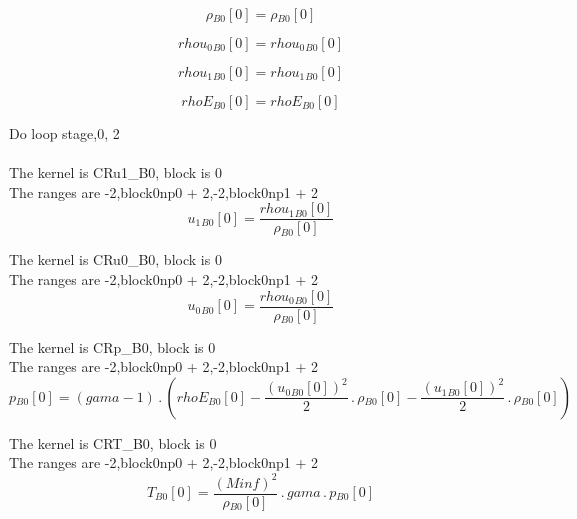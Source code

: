 \documentclass{article}
\begin{document}
\begin{dmath}{\rho{_{B0}}}[{0}] = {\rho{_{B0}}}[{0}]\end{dmath}

\begin{dmath}{rhou_{0}{_{B0}}}[{0}] = {rhou_{0}{_{B0}}}[{0}]\end{dmath}

\begin{dmath}{rhou_{1}{_{B0}}}[{0}] = {rhou_{1}{_{B0}}}[{0}]\end{dmath}

\begin{dmath}{rhoE{_{B0}}}[{0}] = {rhoE{_{B0}}}[{0}]\end{dmath}

\noindent Do loop stage,0, 2\\
\\\noindent The kernel is CRu1_B0, block is 0\\\noindent The ranges are -2,block0np0 + 2,-2,block0np1 + 2\\\begin{dmath}{u_{1}{_{B0}}}[{0}] = \frac{{rhou_{1}{_{B0}}}[{0}]}{{\rho{_{B0}}}[{0}]}\end{dmath}

\noindent The kernel is CRu0_B0, block is 0\\\noindent The ranges are -2,block0np0 + 2,-2,block0np1 + 2\\\begin{dmath}{u_{0}{_{B0}}}[{0}] = \frac{{rhou_{0}{_{B0}}}[{0}]}{{\rho{_{B0}}}[{0}]}\end{dmath}

\noindent The kernel is CRp_B0, block is 0\\\noindent The ranges are -2,block0np0 + 2,-2,block0np1 + 2\\\begin{dmath}{p{_{B0}}}[{0}] = \left(gama - 1\right) \,.\, \left({rhoE{_{B0}}}[{0}] - \frac{\left({u_{0}{_{B0}}}[{0}] \right)^{2}}{2} \,.\, {\rho{_{B0}}}[{0}] - \frac{\left({u_{1}{_{B0}}}[{0}] \right)^{2}}{2} \,.\, 
{\rho{_{B0}}}[{0}]\right)\end{dmath}

\noindent The kernel is CRT_B0, block is 0\\\noindent The ranges are -2,block0np0 + 2,-2,block0np1 + 2\\\begin{dmath}{T{_{B0}}}[{0}] = \frac{\left(Minf \right)^{2}}{{\rho{_{B0}}}[{0}]} \,.\, gama \,.\, {p{_{B0}}}[{0}]\end{dmath}
\end{document}
